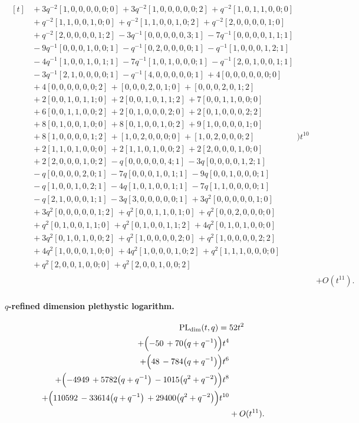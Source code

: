 \documentclass[10pt]{article}
\begin{document}
\[\begin{aligned}
\begin{aligned}[t]
  &{}+3q^{-2}[1,0,0,0,0,0;0]\,+3q^{-2}[1,0,0,0,0,0;2]\,+q^{-2}[1,0,1,1,0,0;0] \\
  &{}+q^{-2}[1,1,0,0,1,0;0]\,+q^{-2}[1,1,0,0,1,0;2]\,+q^{-2}[2,0,0,0,0,1;0] \\
  &{}+q^{-2}[2,0,0,0,0,1;2]\,-3q^{-1}[0,0,0,0,0,3;1]\,-7q^{-1}[0,0,0,0,1,1;1] \\
  &{}-9q^{-1}[0,0,0,1,0,0;1]\,-q^{-1}[0,2,0,0,0,0;1]\,-q^{-1}[1,0,0,0,1,2;1] \\
  &{}-4q^{-1}[1,0,0,1,0,1;1]\,-7q^{-1}[1,0,1,0,0,0;1]\,-q^{-1}[2,0,1,0,0,1;1] \\
  &{}-3q^{-1}[2,1,0,0,0,0;1]\,-q^{-1}[4,0,0,0,0,0;1]\,+4[0,0,0,0,0,0;0] \\
  &{}+4[0,0,0,0,0,0;2]\,+[0,0,0,2,0,1;0]\,+[0,0,0,2,0,1;2] \\
  &{}+2[0,0,1,0,1,1;0]\,+2[0,0,1,0,1,1;2]\,+7[0,0,1,1,0,0;0] \\
  &{}+6[0,0,1,1,0,0;2]\,+2[0,1,0,0,0,2;0]\,+2[0,1,0,0,0,2;2] \\
  &{}+8[0,1,0,0,1,0;0]\,+8[0,1,0,0,1,0;2]\,+9[1,0,0,0,0,1;0] \\
  &{}+8[1,0,0,0,0,1;2]\,+[1,0,2,0,0,0;0]\,+[1,0,2,0,0,0;2] \\
  &{}+2[1,1,0,1,0,0;0]\,+2[1,1,0,1,0,0;2]\,+2[2,0,0,0,1,0;0] \\
  &{}+2[2,0,0,0,1,0;2]\,-q[0,0,0,0,0,4;1]\,-3q[0,0,0,0,1,2;1] \\
  &{}-q[0,0,0,0,2,0;1]\,-7q[0,0,0,1,0,1;1]\,-9q[0,0,1,0,0,0;1] \\
  &{}-q[1,0,0,1,0,2;1]\,-4q[1,0,1,0,0,1;1]\,-7q[1,1,0,0,0,0;1] \\
  &{}-q[2,1,0,0,0,1;1]\,-3q[3,0,0,0,0,0;1]\,+3q^{2}[0,0,0,0,0,1;0] \\
  &{}+3q^{2}[0,0,0,0,0,1;2]\,+q^{2}[0,0,1,1,0,1;0]\,+q^{2}[0,0,2,0,0,0;0] \\
  &{}+q^{2}[0,1,0,0,1,1;0]\,+q^{2}[0,1,0,0,1,1;2]\,+4q^{2}[0,1,0,1,0,0;0] \\
  &{}+3q^{2}[0,1,0,1,0,0;2]\,+q^{2}[1,0,0,0,0,2;0]\,+q^{2}[1,0,0,0,0,2;2] \\
  &{}+4q^{2}[1,0,0,0,1,0;0]\,+4q^{2}[1,0,0,0,1,0;2]\,+q^{2}[1,1,1,0,0,0;0] \\
  &{}+q^{2}[2,0,0,1,0,0;0]\,+q^{2}[2,0,0,1,0,0;2]\end{aligned}\Bigr)t^{10} \\
  &+ O(t^{11}).
\end{aligned}
\]
\paragraph{$q$-refined dimension plethystic logarithm.}
\[
\begin{aligned}
\operatorname{PL}_{\mathrm{dim}}(t,q) ={}&
   52t^{2} \\
  + \Bigl(-50\,+70\bigl(q+q^{-1}\bigr)\Bigr)t^{4} \\
  + \Bigl(48\,-784\bigl(q+q^{-1}\bigr)\Bigr)t^{6} \\
  + \Bigl(-4949\,+5782\bigl(q+q^{-1}\bigr)\,-1015\bigl(q^{2}+q^{-2}\bigr)\Bigr)t^{8} \\
  + \Bigl(110592\,-33614\bigl(q+q^{-1}\bigr)\,+29400\bigl(q^{2}+q^{-2}\bigr)\Bigr)t^{10} \\
  &+ O(t^{11}).
\end{aligned}
\]
\end{document}

